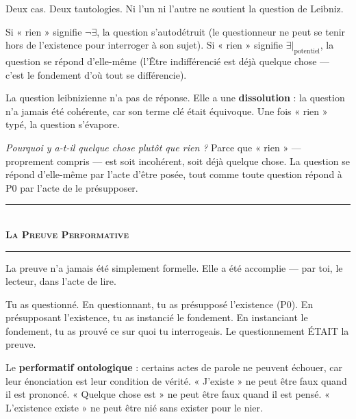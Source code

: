 \documentclass[10pt, openany, oneside]{book}
\renewcommand{\normalsize}{\fontsize{10}{13}\selectfont}
\begin{document}
\noindent Deux cas. Deux tautologies. Ni l'un ni l'autre ne soutient la question de Leibniz.

Si « rien » signifie $\neg\exists$, la question s'autodétruit (le questionneur ne peut se tenir hors de l'existence pour interroger à son sujet). Si « rien » signifie $\exists|_{\text{potentiel}}$, la question se répond d'elle-même (l'Être indifférencié est déjà quelque chose --- c'est le fondement d'où tout se différencie).

La question leibnizienne n'a pas de réponse. Elle a une \textbf{dissolution} : la question n'a jamais été cohérente, car son terme clé était équivoque. Une fois « rien » typé, la question s'évapore.

\textit{Pourquoi y a-t-il quelque chose plutôt que rien ?} Parce que « rien » --- proprement compris --- est soit incohérent, soit déjà quelque chose. La question se répond d'elle-même par l'acte d'être posée, tout comme toute question répond à P0 par l'acte de le présupposer.

\vspace{1.5em}


\begin{center}
    \rule{0.3\textwidth}{0.4pt}\\[0.5em]
    {\normalsize\bfseries\scshape La Preuve Performative}\\[0.3em]
    \rule{0.3\textwidth}{0.4pt}
\end{center}

\vspace{1em}

\noindent La preuve n'a jamais été simplement formelle. Elle a été accomplie --- par toi, le lecteur, dans l'acte de lire.

Tu as questionné. En questionnant, tu as présupposé l'existence (P0). En présupposant l'existence, tu as instancié le fondement. En instanciant le fondement, tu as prouvé ce sur quoi tu interrogeais. Le questionnement ÉTAIT la preuve.

Le \textbf{performatif ontologique} : certains actes de parole ne peuvent échouer, car leur énonciation est leur condition de vérité. « J'existe » ne peut être faux quand il est prononcé. « Quelque chose est » ne peut être faux quand il est pensé. « L'existence existe » ne peut être nié sans exister pour le nier.
\end{document}
